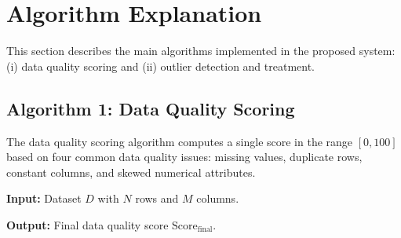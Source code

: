 \documentclass[conference]{IEEEtran}
\begin{document}
\section{Algorithm Explanation}

This section describes the main algorithms implemented in the proposed system: (i) data quality scoring and (ii) outlier detection and treatment.

\subsection{Algorithm 1: Data Quality Scoring}

The data quality scoring algorithm computes a single score in the range $[0, 100]$ based on four common data quality issues: missing values, duplicate rows, constant columns, and skewed numerical attributes.

\textbf{Input:} Dataset $D$ with $N$ rows and $M$ columns.

\textbf{Output:} Final data quality score $\text{Score}_{\text{final}}$.
\end{document}

